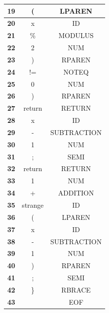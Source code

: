 \documentclass{article}
\begin{document}
\begin{latin}
\begin{longtable}[c]{|c|c|c|}
\textbf{19} & (                       & LPAREN                \\ \hline
\textbf{20} & x                       & ID                    \\ \hline
\textbf{21} & \%                      & MODULUS               \\ \hline
\textbf{22} & 2                       & NUM                   \\ \hline
\textbf{23} & )                       & RPAREN                \\ \hline
\textbf{24} & !=                      & NOTEQ                 \\ \hline
\textbf{25} & 0                       & NUM                   \\ \hline
\textbf{26} & )                       & RPAREN                \\ \hline
\textbf{27} & return                  & RETURN                \\ \hline
\textbf{28} & x                       & ID                    \\ \hline
\textbf{29} & -                       & SUBTRACTION           \\ \hline
\textbf{30} & 1                       & NUM                   \\ \hline
\textbf{31} & ;                       & SEMI                  \\ \hline
\textbf{32} & return                  & RETURN                \\ \hline
\textbf{33} & 1                       & NUM                   \\ \hline
\textbf{34} & +                       & ADDITION              \\ \hline
\textbf{35} & strange                 & ID                    \\ \hline
\textbf{36} & (                       & LPAREN                \\ \hline
\textbf{37} & x                       & ID                    \\ \hline
\textbf{38} & -                       & SUBTRACTION           \\ \hline
\textbf{39} & 1                       & NUM                   \\ \hline
\textbf{40} & )                       & RPAREN                \\ \hline
\textbf{41} & ;                       & SEMI                  \\ \hline
\textbf{42} & \} & RBRACE                \\ \hline
\textbf{43} &                         & EOF                   \\ \hline
\end{longtable}
\end{latin}
\end{document}
